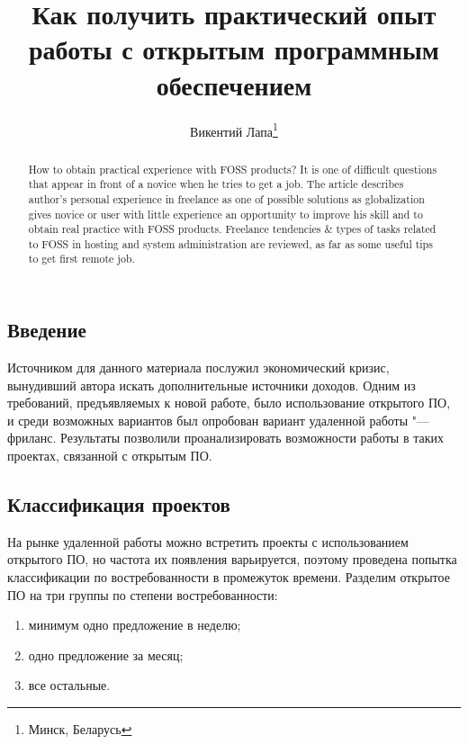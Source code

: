 \documentclass[10pt, a5paper]{article}
\begin{document}
\title{Как получить практический опыт работы с открытым программным обеспечением}%

\author{Викентий Лапа\footnote{Минск, Беларусь}}
\maketitle

\begin{abstract}
How to obtain practical experience with FOSS products? It is one of difficult questions that appear in front of a novice when he tries to get a job. The article describes author's personal experience in freelance as one of possible solutions as globalization gives novice or user with little experience an opportunity to improve his skill and to obtain real practice with FOSS products. Freelance tendencies \& types of tasks related to FOSS in hosting and system administration are reviewed, as far as some useful tips  to get first remote job.
\end{abstract}

\subsection*{Введение}

Источником для данного материала послужил экономический кризис, вынудивший автора искать дополнительные источники доходов. Одним из требований, предъявляемых к новой работе, было использование открытого ПО, и среди возможных вариантов был опробован вариант удаленной работы "--- фриланс. Результаты позволили проанализировать возможности работы в таких проектах, связанной с открытым ПО.

\subsection*{Классификация проектов}

На рынке удаленной работы можно встретить проекты с использованием открытого ПО, но частота их появления варьируется, поэтому проведена попытка классификации по востребованности в промежуток времени. 
Разделим открытое ПО на три группы по степени востребованности:

\begin{enumerate}
  \item минимум одно предложение в неделю;
  \item одно предложение за месяц;
  \item все остальные.
\end{enumerate}
\end{document}
